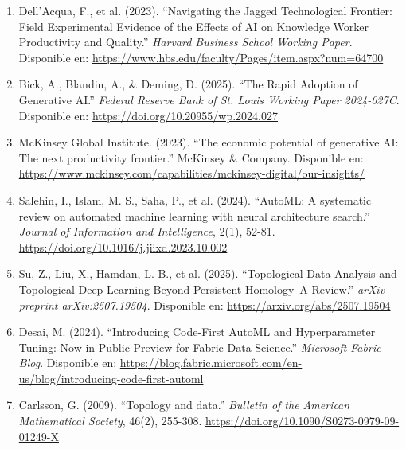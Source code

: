 \documentclass[11pt]{article}
\begin{document}
\begin{enumerate}
        \item Dell'Acqua, F., et al. (2023). ``Navigating the Jagged Technological Frontier: Field Experimental Evidence of the Effects of AI on Knowledge Worker Productivity and Quality.'' \textit{Harvard Business School Working Paper}. Disponible en: \url{https://www.hbs.edu/faculty/Pages/item.aspx?num=64700}

        \item Bick, A., Blandin, A., \& Deming, D. (2025). ``The Rapid Adoption of Generative AI.'' \textit{Federal Reserve Bank of St. Louis Working Paper 2024-027C}. Disponible en: \url{https://doi.org/10.20955/wp.2024.027}

        \item McKinsey Global Institute. (2023). ``The economic potential of generative AI: The next productivity frontier.'' McKinsey \& Company. Disponible en: \url{https://www.mckinsey.com/capabilities/mckinsey-digital/our-insights/}

        \item Salehin, I., Islam, M. S., Saha, P., et al. (2024). ``AutoML: A systematic review on automated machine learning with neural architecture search.'' \textit{Journal of Information and Intelligence}, 2(1), 52-81. \url{https://doi.org/10.1016/j.jiixd.2023.10.002}

        \item Su, Z., Liu, X., Hamdan, L. B., et al. (2025). ``Topological Data Analysis and Topological Deep Learning Beyond Persistent Homology--A Review.'' \textit{arXiv preprint arXiv:2507.19504}. Disponible en: \url{https://arxiv.org/abs/2507.19504}

        \item Desai, M. (2024). ``Introducing Code-First AutoML and Hyperparameter Tuning: Now in Public Preview for Fabric Data Science.'' \textit{Microsoft Fabric Blog}. Disponible en: \url{https://blog.fabric.microsoft.com/en-us/blog/introducing-code-first-automl}

        \item Carlsson, G. (2009). ``Topology and data.'' \textit{Bulletin of the American Mathematical Society}, 46(2), 255-308. \url{https://doi.org/10.1090/S0273-0979-09-01249-X}
    \end{enumerate}
\end{document}
